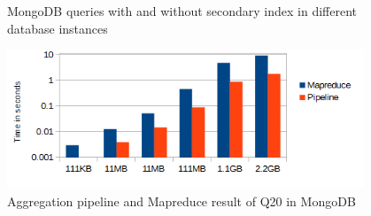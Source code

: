 \begin{figure}[hbtp]
	\centering
	\centering
	\caption{MongoDB queries with and without secondary index in different database instances}
	\label{fig:xmark-mongodb-index-noindex}
\end{figure}

\begin{figure}[hbtp]
	\centering
	\includegraphics[width=0.95\textwidth]{img/result/mongodb/mongodb-mapreduce-pipeline}
	\caption{Aggregation pipeline and Mapreduce result of Q20 in MongoDB}
	\label{fig:xmark-result-mongodb-pipeline-mapreduce}
	
\end{figure}


